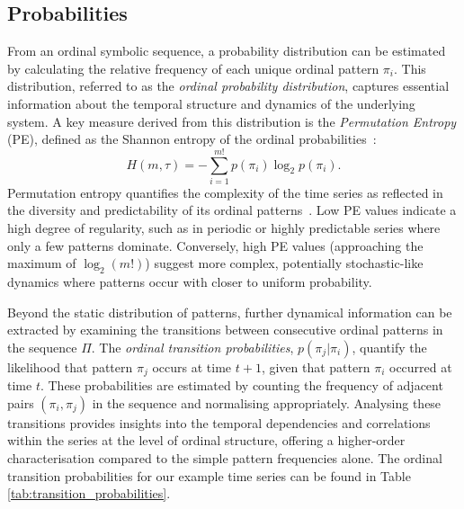 \subsection{Probabilities}
From an ordinal symbolic sequence, a probability distribution can be estimated by calculating the relative frequency of each unique ordinal pattern $\pi_i$. This distribution, referred to as the \emph{ordinal probability distribution}, captures essential information about the temporal structure and dynamics of the underlying system. A key measure derived from this distribution is the \emph{Permutation Entropy} (PE), defined as the Shannon entropy of the ordinal probabilities~\cite{bandt_pompe_2002}:
\[
    H(m, \tau) = -\sum_{i=1}^{m!} p(\pi_i) \log_2 p(\pi_i).
\]
Permutation entropy quantifies the complexity of the time series as reflected in the diversity and predictability of its ordinal patterns~\cite{bandt_pompe_2002}. Low PE values indicate a high degree of regularity, such as in periodic or highly predictable series where only a few patterns dominate. Conversely, high PE values (approaching the maximum of $\log_2(m!)$) suggest more complex, potentially stochastic-like dynamics where patterns occur with closer to uniform probability.

Beyond the static distribution of patterns, further dynamical information can be extracted by examining the transitions between consecutive ordinal patterns in the sequence $\Pi$. The \emph{ordinal transition probabilities}, $p(\pi_j | \pi_i)$, quantify the likelihood that pattern $\pi_j$ occurs at time $t+1$, given that pattern $\pi_i$ occurred at time $t$. These probabilities are estimated by counting the frequency of adjacent pairs $(\pi_i, \pi_j)$ in the sequence and normalising appropriately. Analysing these transitions provides insights into the temporal dependencies and correlations within the series at the level of ordinal structure, offering a higher-order characterisation compared to the simple pattern frequencies alone. The ordinal transition probabilities for our example time series can be found in Table \ref{tab:transition_probabilities}.


